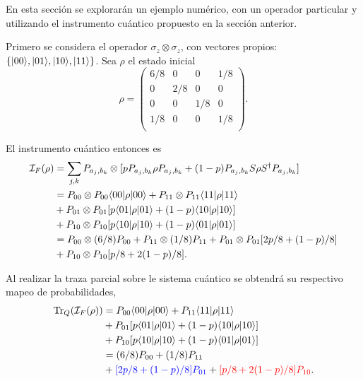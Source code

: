 En esta sección se explorarán un ejemplo numérico, con un operador particular y utilizando el instrumento cuántico propuesto en la sección anterior.


Primero se considera el operador $\sigma_z \otimes \sigma_z$, con vectores propios: $\{|00\rangle, |01\rangle, |10\rangle, |11\rangle\}$. Sea $\rho $ el estado inicial
\[\rho={\begin{pmatrix}6/8&0&0 &1/8\\0&2/8&0 &0\\0 &0 &1/8 &0 \\1/8&0&0&1/8\\\end{pmatrix}}.\]

El instrumento cuántico entonces es
\begin{equation}\label{primer_alternativa_ejemplo}
    \begin{split}
        \mathcal{I}_F(\rho)&=\sum_{j,k}P_{a_j,b_k}\otimes[p P_{a_j,b_k}\rho P_{a_j,b_k}+(1-p)P_{a_j,b_k}S\rho S^\dagger P_{a_j,b_k}]\\
        &=P_{00}\otimes P_{00} \langle 00|\rho|00\rangle + P_{11}\otimes P_{11} \langle 11|\rho|11\rangle\\
        &+P_{01} \otimes P_{01}[p \langle 01|\rho|01\rangle+(1-p)\langle 10|\rho|10\rangle]\\
        &+P_{10} \otimes P_{10}[p \langle 10|\rho|10\rangle+(1-p)\langle 01|\rho|01\rangle]\\
        &=P_{00}\otimes (6/8)P_{00} + P_{11}\otimes (1/8)P_{11}+P_{01} \otimes P_{01}[2p/8 +(1-p)/8]\\
        &+P_{10} \otimes P_{10}[p/8+2(1-p)/8].\\
    \end{split}
\end{equation}


Al realizar la traza parcial sobre le sistema cuántico se obtendrá su respectivo mapeo de probabilidades, \begin{equation}\label{traza_S1_ejemplo1}
    \begin{split}
        {\rm Tr}_Q(\mathcal{I}_F(\rho)) &= P_{00} \langle 00|\rho|00\rangle + P_{11} \langle 11|\rho|11\rangle\\
        &+P_{01}[p \langle 01|\rho|01\rangle+(1-p)\langle 10|\rho|10\rangle]\\
        &+P_{10}[p \langle 10|\rho|10\rangle+(1-p)\langle 01|\rho|01\rangle]\\
        &=(6/8)P_{00} + (1/8)P_{11}\\
        &+{\color{blue}[2p/8 +(1-p)/8]P_{01}}+ {\color{red}[p/8+2(1-p)/8]P_{10}}.\\
    \end{split}
\end{equation}


